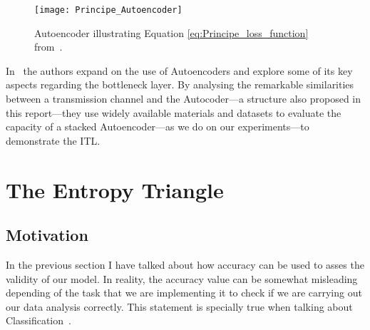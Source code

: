 \begin{figure}[H]
	\centering	
	\texttt{[image: Principe\_Autoencoder]}
	\caption{Autoencoder illustrating Equation \ref{eq:Principe_loss_function} from~\protect\cite{Santana_2016}.}
	\label{fig:figure_autoencoder2}
\end{figure} 

In~\cite{Yu_2019} the authors expand on the use of Autoencoders and explore some of its key aspects regarding the bottleneck layer. By analysing the remarkable similarities between a transmission channel and the Autocoder---a structure also proposed in this report---they use widely available materials and datasets to evaluate the capacity of a stacked Autoencoder---as we do on our experiments---to demonstrate the ITL. 


\section{The Entropy Triangle}
\label{sec:et}

\subsection{Motivation}

In the previous section I have talked about how accuracy can be used to asses the validity of our model. In reality, the accuracy value can be somewhat misleading depending of the task that we are implementing it to check if we are carrying out our data analysis correctly. This statement is specially true when talking about Classification~\cite{val:pel:14a}.\par

